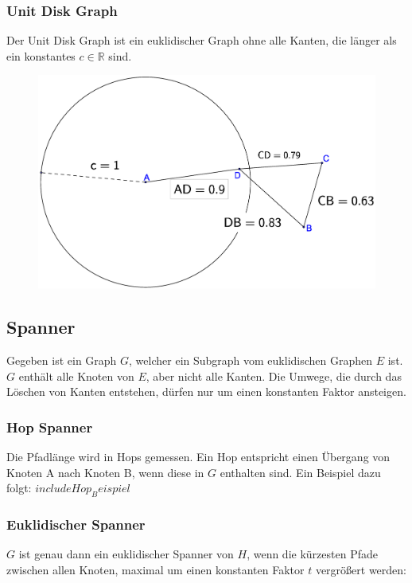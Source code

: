 \documentclass[a4paper,twoside]{IEEEtran}
\begin{document}
\subsubsection{Unit Disk Graph}
Der Unit Disk Graph ist ein euklidischer Graph ohne alle Kanten, die länger als ein konstantes $c \in \mathds{R} $ sind.
\begin{figure}[h!]
\centering
\includegraphics[width=0.99\linewidth]{UnitGraph.eps}
\caption{}
\label{fig:UnitGraph}
\end{figure}



\subsection{Spanner}
Gegeben ist ein Graph $G $, welcher ein Subgraph vom euklidischen Graphen $E $ ist. $G $ enthält alle Knoten von $E $, aber nicht alle Kanten. Die Umwege, die durch das Löschen von Kanten entstehen, dürfen nur um einen konstanten Faktor ansteigen. 

\subsubsection{Hop Spanner}
Die Pfadlänge wird in Hops gemessen. Ein Hop entspricht einen Übergang von Knoten A nach Knoten B, wenn diese in $G $ enthalten sind. Ein Beispiel dazu folgt:
$include Hop_Beispiel $
\subsubsection{Euklidischer Spanner}
$G $ ist genau dann ein euklidischer Spanner von $H $, wenn die kürzesten Pfade zwischen allen Knoten, maximal um einen konstanten Faktor $t $ vergrößert werden:
\end{document}
